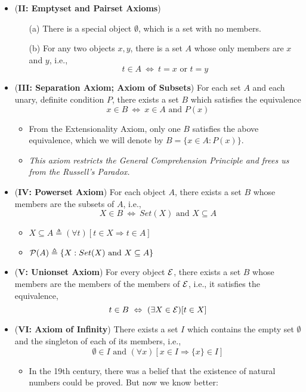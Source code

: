 \documentclass{myproc}
\begin{document}
\begin{itemize}
\item ({\bf{}II: Emptyset and Pairset Axioms}) 
	\begin{enumerate}
	\item [(a)] There is a special object $\emptyset$, which is a set with
		no members.
	\item [(b)] For any two objects $x, y$, there is a set $A$ whose only
		members are $x$ and $y$, i.e.,
			\[ t \in A \ \Leftrightarrow\ t = x \mbox{\ or\ } t = y\]
	\end{enumerate}
\item ({\bf{}III: Separation Axiom; Axiom of Subsets})
	For each set $A$ and each unary, definite condition $P$, there
		exists a set $B$ which satisfies the equivalence
		\[ x \in B \ \Leftrightarrow\ x \in A \mbox{\ and\ } P(x)\]
		\begin{itemize}
		\item From the Extensionality Axiom, only one $B$ satisfies the
			above equivalence, which we will denote by
				$B = \{x \in A: P(x)\}$.
		\item {\em{}This axiom restricts 
			the General Comprehension
			Principle and frees us from the Russell's Paradox.\/}
		\end{itemize}
\item ({\bf{}IV: Powerset Axiom})
	For each object $A$, there exists a set $B$ whose members are
	the subsets of $A$, i.e.,
	\[ X \in B\ \Leftrightarrow\ Set(X) \mbox{\ and\ } X \subseteq A\]
		\begin{itemize}
		\item $X \subseteq A \triangleq (\forall{t})[t \in X \Rightarrow t \in A]$
		\item ${\cal{}P}(A) \triangleq \{X: Set(X) \mbox{\ and\ } X \subseteq A\}$
		\end{itemize}
\item ({\bf{}V: Unionset Axiom})
	For every object $\cal{}E$, there exists a set $B$ whose members
		are the members of the members of $\cal{}E$, i.e., it satisfies
		the equivalence,
		\[ t \in B\ \Leftrightarrow\ (\exists{X}\in {\cal{}E})[t \in X] \]
\item ({\bf{}VI: Axiom of Infinity})
	There exists a set $I$ which contains the empty set $\emptyset$
	and the singleton of each of its members, i.e.,
	\[ \emptyset \in I \mbox{\ and\ } (\forall{x})[x \in I \Rightarrow
	\{x\} \in I]\]
	\begin{itemize}
	\item In the 19th century, there was a belief that the existence of
		natural numbers could be proved. But now we know better:

\end{itemize}
\end{itemize}
\end{document}
